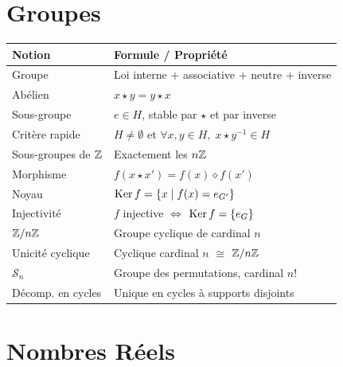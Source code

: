 \section{Groupes}

\begin{center}
\renewcommand{\arraystretch}{1.4}
\begin{tabular}{|l|l|}
\hline
\textbf{Notion} & \textbf{Formule / Propriété} \\
\hline
Groupe & Loi interne $+$ associative $+$ neutre $+$ inverse \\
Abélien & $x \star y = y \star x$ \\
Sous-groupe & $e \in H$, stable par $\star$ et par inverse \\
Critère rapide & $H \neq \emptyset$ et $\forall x,y \in H, \; x \star y^{-1} \in H$ \\
Sous-groupes de $\mathbb{Z}$ & Exactement les $n\mathbb{Z}$ \\
Morphisme & $f(x \star x') = f(x) \diamond f(x')$ \\
Noyau & $\operatorname{Ker} f = \{x \mid f(x) = e_{G'}\}$ \\
Injectivité & $f$ injective $\iff$ $\operatorname{Ker} f = \{e_G\}$ \\
$\mathbb{Z}/n\mathbb{Z}$ & Groupe cyclique de cardinal $n$ \\
Unicité cyclique & Cyclique cardinal $n$ $\cong$ $\mathbb{Z}/n\mathbb{Z}$ \\
$\mathcal{S}_n$ & Groupe des permutations, cardinal $n!$ \\
Décomp. en cycles & Unique en cycles à supports disjoints \\
\hline
\end{tabular}
\end{center}

\section{Nombres Réels}


